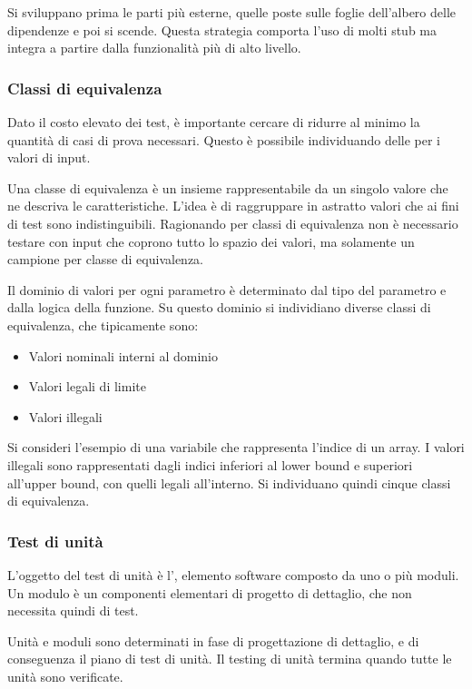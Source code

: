 Si sviluppano prima le parti più esterne, quelle poste sulle foglie dell'albero
delle dipendenze e poi si scende. Questa strategia comporta l'uso di molti stub
ma integra a partire dalla funzionalità più di alto livello.

\subsubsection{Classi di equivalenza}
\label{ssub:classi_di_equivalenza}

Dato il costo elevato dei test, è importante cercare di ridurre al minimo la
quantità di casi di prova necessari. Questo è possibile individuando delle
 per i valori di input.

Una classe di equivalenza è un insieme rappresentabile da un singolo valore che
ne descriva le caratteristiche. L'idea è di raggruppare in astratto valori che
ai fini di test sono indistinguibili. Ragionando per classi di equivalenza non è
necessario testare con input che coprono tutto lo spazio dei valori, ma
solamente un campione per classe di equivalenza.

Il dominio di valori per ogni parametro è determinato dal tipo del parametro e
dalla logica della funzione. Su questo dominio si individiano diverse classi di
equivalenza, che tipicamente sono:

\begin{itemize}
  \item Valori nominali interni al dominio
  \item Valori legali di limite
  \item Valori illegali
\end{itemize}

Si consideri l'esempio di una variabile che rappresenta l'indice di un array. I
valori illegali sono rappresentati dagli indici inferiori al lower bound e
superiori all'upper bound, con quelli legali all'interno. Si individuano quindi
cinque classi di equivalenza.

\subsubsection{Test di unità}
\label{ssub:test_di_unita}

L'oggetto del test di unità è l', elemento software composto da
uno o più moduli. Un modulo è un componenti elementari di progetto di dettaglio,
che non necessita quindi di test.

Unità e moduli sono determinati in fase di progettazione di dettaglio, e di
conseguenza il piano di test di unità. Il testing di unità termina quando tutte
le unità sono verificate.

